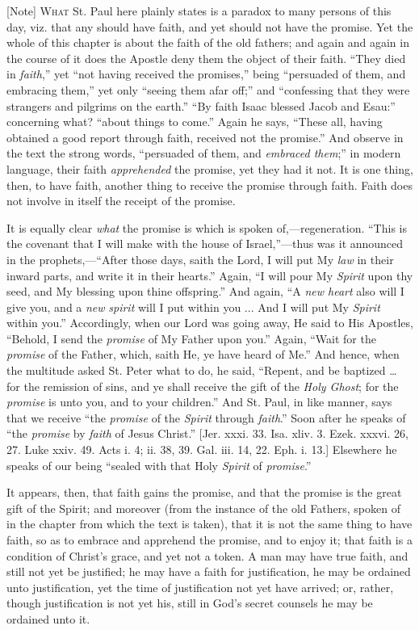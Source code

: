 [Note] W\textsc{hat} St. Paul here plainly
states is a paradox to many persons of this day, viz. that any should
have faith, and yet should not have the promise. Yet the whole of this
chapter is about the faith of the old fathers; and again and again in
the course of it does the Apostle deny them the object of their faith.
``They died in \emph{faith},'' yet ``not having received
the promises,'' being ``persuaded of them, and embracing
them,'' yet only ``seeing them afar off;'' and
``confessing that they were strangers and pilgrims on the
earth.'' ``By faith Isaac blessed Jacob and Esau:''
concerning what? ``about things to come.'' Again he says,
``These all, having obtained a good report through faith, received
not the promise.'' And observe in the text the strong words,
``persuaded of them, and \emph{embraced them};'' in modern
language, their faith \emph{apprehended} the promise, yet they had it
not. It is one thing, then, to have faith, another thing to receive
the promise through faith. Faith does not involve in itself the
receipt of the promise.

It is equally clear \emph{what} the promise is which is spoken of,—regeneration.
``This is the covenant that I will make with the house of
Israel,''—thus was it announced in the prophets,—``After
those days, saith the Lord, I will put My \emph{law} in their inward
parts, and write it in their hearts.'' Again, ``I will pour My
\emph{Spirit} upon thy seed, and My blessing upon thine
offspring.'' And again, ``A \emph{new heart} also will I give
you, and a \emph{new} \emph{spirit} will I put within you ... And I will put
My \emph{Spirit} within you.'' Accordingly, when our Lord was
going away, He said to His Apostles, ``Behold, I send the \emph{promise}
of My Father upon you.'' Again, ``Wait for the \emph{promise}
of the Father, which, saith He, ye have heard of Me.'' And hence,
when the multitude asked St. Peter what to do, he said, ``Repent,
and be baptized … for the remission of sins, and ye shall receive
the gift of the \emph{Holy Ghost}; for the \emph{promise} is unto you,
and to your children.'' And St. Paul, in like manner, says that we
receive ``the \emph{promise} of the \emph{Spirit} through \emph{faith}.''
Soon after he speaks of ``the \emph{promise} by \emph{faith} of
Jesus Christ.'' [Jer. xxxi. 33. Isa. xliv. 3. Ezek. xxxvi. 26, 27.
Luke xxiv. 49. Acts i. 4; ii. 38, 39. Gal. iii. 14, 22. Eph. i. 13.]
Elsewhere he speaks of our being ``sealed with that Holy \emph{Spirit}
of \emph{promise}.''

It appears, then, that faith gains the promise, and that the
promise is the great gift of the Spirit; and moreover (from the
instance of the old Fathers, spoken of in the chapter from which the
text is taken), that it is not the same thing to have faith, so as to
embrace and apprehend the promise, and to enjoy it; that faith is a
condition of Christ's grace, and yet not a token. A man may have true
faith, and still not yet be justified; he may have a faith for
justification, he may be ordained unto justification, yet the time of
justification not yet have arrived; or, rather, though justification
is not yet his, still in God's secret counsels he may be ordained unto
it.

